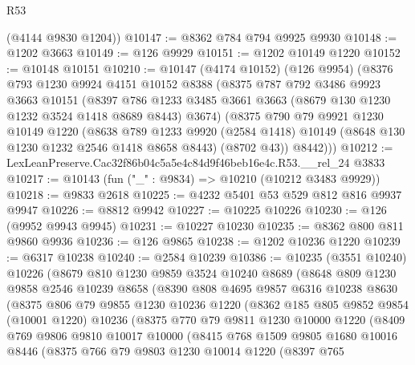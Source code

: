 \begin{lexlean}{R53}
\begin{coremodule}
      (@4144 @9830 @1204))
@10147 := @8362 @784 @794 @9925 @9930
@10148 := @1202 @3663
@10149 := @126 @9929
@10151 := @1202 @10149 @1220
@10152 := @10148 @10151
@10210 := @10147
    (@4174 @10152)
    (@126 @9954)
    (@8376
      @793
      @1230
      @9924
      @4151
      @10152
      @8388
      (@8375
        @787
        @792
        @3486
        @9923
        @3663
        @10151
        (@8397 @786 @1233 @3485 @3661 @3663 (@8679 @130 @1230 @1232 @3524 @1418 @8689 @8443) @3674)
        (@8375
          @790
          @79
          @9921
          @1230
          @10149
          @1220
          (@8638
            @789
            @1233
            @9920
            (@2584 @1418)
            @10149
            (@8648 @130 @1230 @1232 @2546 @1418 @8658 @8443)
            (@8702 @43))
          @8442)))
@10212 := LexLeanPreserve.Cac32f86b04c5a5e4c84d9f46beb16e4c.R53.__rel_24 @3833
@10217 := @10143 (fun ("_" : @9834) => @10210 (@10212 @3483 @9929))
@10218 := @9833 @2618
@10225 := @4232 @5401 @53 @529 @812 @816 @9937 @9947
@10226 := @8812 @9942
@10227 := @10225 @10226
@10230 := @126 (@9952 @9943 @9945)
@10231 := @10227 @10230
@10235 := @8362 @800 @811 @9860 @9936
@10236 := @126 @9865
@10238 := @1202 @10236 @1220
@10239 := @6317 @10238
@10240 := @2584 @10239
@10386 := @10235
    (@3551 @10240)
    @10226
    (@8679
      @810
      @1230
      @9859
      @3524
      @10240
      @8689
      (@8648
        @809
        @1230
        @9858
        @2546
        @10239
        @8658
        (@8390
          @808
          @4695
          @9857
          @6316
          @10238
          @8630
          (@8375
            @806
            @79
            @9855
            @1230
            @10236
            @1220
            (@8362
              @185
              @805
              @9852
              @9854
              (@10001 @1220)
              @10236
              (@8375
                @770
                @79
                @9811
                @1230
                @10000
                @1220
                (@8409
                  @769
                  @9806
                  @9810
                  @10017
                  @10000
                  (@8415
                    @768
                    @1509
                    @9805
                    @1680
                    @10016
                    @8446
                    (@8375
                      @766
                      @79
                      @9803
                      @1230
                      @10014
                      @1220
                      (@8397
                        @765

\end{coremodule}
\end{lexlean}
